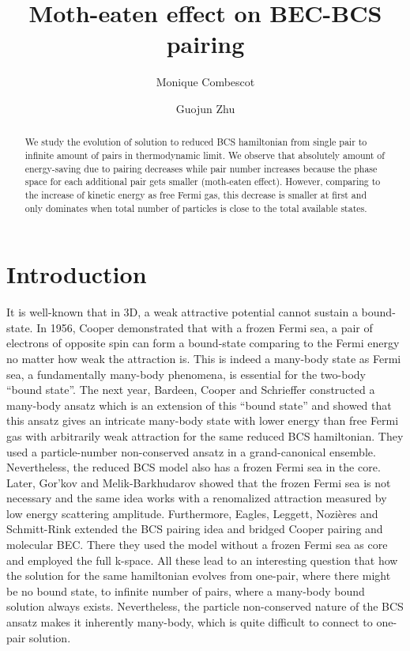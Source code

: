 \documentclass{article}
\author{Monique Combescot \and Guojun Zhu}
\title{Moth-eaten effect on BEC-BCS pairing}
\begin{document}
\maketitle
{}
\begin{abstract}
We study the evolution of solution to reduced BCS hamiltonian from single pair to infinite amount of pairs in thermodynamic limit.  We observe that absolutely amount of energy-saving due to pairing decreases while pair number increases because the phase space for each additional pair gets smaller (moth-eaten effect).  However, comparing to the increase of kinetic energy as free Fermi gas, this decrease is smaller at first and only dominates  when total number of particles is close to the total available states.  
\end{abstract}
\section{Introduction}
It is well-known that in 3D, a weak attractive potential cannot sustain a bound-state.  In 1956, Cooper demonstrated that with a frozen Fermi sea, a pair of electrons of opposite spin can form a bound-state comparing to the Fermi energy no matter how weak the attraction is\cite{Cooper}.  This is indeed a many-body state as Fermi sea, a fundamentally many-body phenomena,  is essential for the two-body ``bound state''.   The next year, Bardeen, Cooper and Schrieffer constructed a many-body ansatz which is an extension of this ``bound state'' and showed that this ansatz gives an intricate many-body state with lower energy than free Fermi gas with arbitrarily weak attraction\cite{BCS} for the same reduced BCS hamiltonian.  They used a particle-number non-conserved ansatz in a grand-canonical ensemble.  Nevertheless, the reduced BCS model also has a frozen Fermi sea in the core. Later,   Gor'kov and Melik-Barkhudarov showed that the frozen Fermi sea is not necessary and the same idea works with a renomalized attraction measured by low energy scattering amplitude\cite{Gorkov}.   Furthermore, Eagles\cite{Eagle}, Leggett\cite{LeggettCrossover}, Nozi\`{e}res and Schmitt-Rink\cite{Nozieres} extended the BCS pairing idea and bridged Cooper pairing and molecular BEC. There they used the model without a frozen Fermi sea as core and employed the full k-space.  All these lead to an interesting question that how the solution for the same hamiltonian evolves from one-pair, where there might be no bound state, to infinite number of pairs, where a many-body bound solution always exists.  Nevertheless, the particle non-conserved nature of the BCS ansatz makes it inherently many-body, which is quite difficult to connect to one-pair solution.  
\end{document}
